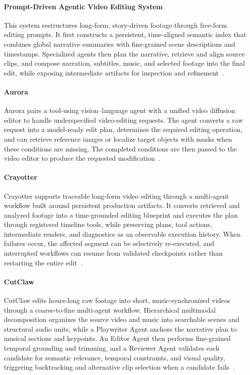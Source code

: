 \paragraph{Prompt-Driven Agentic Video Editing System}
This system restructures long-form, story-driven footage through free-form editing prompts. It first constructs a persistent, time-aligned semantic index that combines global narrative summaries with fine-grained scene descriptions and timestamps. Specialized agents then plan the narrative, retrieve and align source clips, and compose narration, subtitles, music, and selected footage into the final edit, while exposing intermediate artifacts for inspection and refinement~\cite{avg250916811}.

\paragraph{Aurora}
Aurora pairs a tool-using vision--language agent with a unified video diffusion editor to handle underspecified video-editing requests. The agent converts a raw request into a model-ready edit plan, determines the required editing operation, and can retrieve reference images or localize target objects with masks when these conditions are missing. The completed conditions are then passed to the video editor to produce the requested modification~\cite{avg260518748}.

\paragraph{Crayotter}
Crayotter supports traceable long-form video editing through a multi-agent workflow built around persistent production artifacts. It converts retrieved and analyzed footage into a time-grounded editing blueprint and executes the plan through registered timeline tools, while preserving plans, tool actions, intermediate renders, and diagnostics as an observable execution history. When failures occur, the affected segment can be selectively re-executed, and interrupted workflows can resume from validated checkpoints rather than restarting the entire edit~\cite{avg260607636}.

\paragraph{CutClaw}
CutClaw edits hours-long raw footage into short, music-synchronized videos through a coarse-to-fine multi-agent workflow. Hierarchical multimodal decomposition organizes the source video and music into searchable scenes and structural audio units, while a Playwriter Agent anchors the narrative plan to musical sections and keypoints. An Editor Agent then performs fine-grained temporal grounding and trimming, and a Reviewer Agent validates each candidate for semantic relevance, temporal constraints, and visual quality, triggering backtracking and alternative clip selection when a candidate fails~\cite{avg260329664}.


